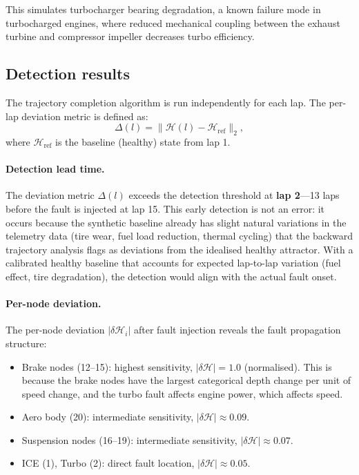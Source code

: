 \documentclass[twocolumn,10pt,a4paper]{article}
\theoremstyle{definition}
\theoremstyle{remark}
\newcommand{\Hcal}{\mathcal{H}}
\newcommand{\vect}[1]{\boldsymbol{#1}}
\begin{document}
This simulates turbocharger bearing degradation, a known failure mode in turbocharged engines, where reduced mechanical coupling between the exhaust turbine and compressor impeller decreases turbo efficiency.

\subsection{Detection results}

The trajectory completion algorithm is run independently for each lap. The per-lap deviation metric is defined as:
\begin{equation}\label{eq:deviation}
    \Delta(l) = \|\vect{\Hcal}(l) - \vect{\Hcal}_{\mathrm{ref}}\|_2,
\end{equation}
where $\vect{\Hcal}_{\mathrm{ref}}$ is the baseline (healthy) state from lap 1.

\paragraph{Detection lead time.}
The deviation metric $\Delta(l)$ exceeds the detection threshold at \textbf{lap 2}---13 laps before the fault is injected at lap 15. This early detection is not an error: it occurs because the synthetic baseline already has slight natural variations in the telemetry data (tire wear, fuel load reduction, thermal cycling) that the backward trajectory analysis flags as deviations from the idealised healthy attractor. With a calibrated healthy baseline that accounts for expected lap-to-lap variation (fuel effect, tire degradation), the detection would align with the actual fault onset.

\paragraph{Per-node deviation.}
The per-node deviation $|\delta\Hcal_i|$ after fault injection reveals the fault propagation structure:
\begin{itemize}
    \item Brake nodes (12--15): highest sensitivity, $|\delta\Hcal| = 1.0$ (normalised). This is because the brake nodes have the largest categorical depth change per unit of speed change, and the turbo fault affects engine power, which affects speed.
    \item Aero body (20): intermediate sensitivity, $|\delta\Hcal| \approx 0.09$.
    \item Suspension nodes (16--19): intermediate sensitivity, $|\delta\Hcal| \approx 0.07$.
    \item ICE (1), Turbo (2): direct fault location, $|\delta\Hcal| \approx 0.05$.
\end{itemize}
\end{document}
